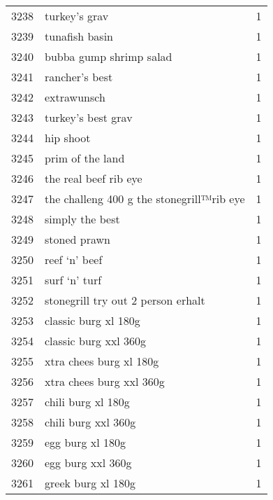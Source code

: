 \begin{tabular}{llr}
3238 &                                      turkey’s grav &      1 \\
3239 &                                     tunafish basin &      1 \\
3240 &                            bubba gump shrimp salad &      1 \\
3241 &                                     rancher’s best &      1 \\
3242 &                                        extrawunsch &      1 \\
3243 &                                 turkey’s best grav &      1 \\
3244 &                                          hip shoot &      1 \\
3245 &                                   prim of the land &      1 \\
3246 &                              the real beef rib eye &      1 \\
3247 &          the challeng 400 g the stonegrill™rib eye &      1 \\
3248 &                                    simply the best &      1 \\
3249 &                                       stoned prawn &      1 \\
3250 &                                      reef ‘n’ beef &      1 \\
3251 &                                      surf ‘n’ turf &      1 \\
3252 &                 stonegrill try out 2 person erhalt &      1 \\
3253 &                               classic burg xl 180g &      1 \\
3254 &                              classic burg xxl 360g &      1 \\
3255 &                            xtra chees burg xl 180g &      1 \\
3256 &                           xtra chees burg xxl 360g &      1 \\
3257 &                                 chili burg xl 180g &      1 \\
3258 &                                chili burg xxl 360g &      1 \\
3259 &                                   egg burg xl 180g &      1 \\
3260 &                                  egg burg xxl 360g &      1 \\
3261 &                                 greek burg xl 180g &      1 \\

\end{tabular}
